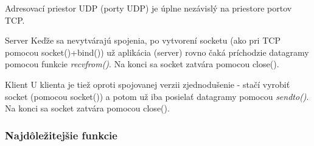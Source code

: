Adresovací priestor UDP (porty UDP) je úplne nezávislý na priestore portov TCP.

\begin{obecne}{Server}
Keďže sa nevytvárajú spojenia, po vytvorení socketu (ako pri TCP pomocou socket()+bind()) už aplikácia (server) rovno čaká príchodzie datagramy pomocou funkcie \emph{recvfrom()}. Na konci sa socket zatvára pomocou close().
\end{obecne}

\begin{obecne}{Klient}
U klienta je tiež oproti spojovanej verzii zjednodušenie - stačí vyrobiť socket (pomocou socket()) a potom už iba posielať datagramy pomocou \emph{sendto()}. Na konci sa socket zatvára pomocou close().
\end{obecne}

\subsubsection*{Najdôležitejšie funkcie}

